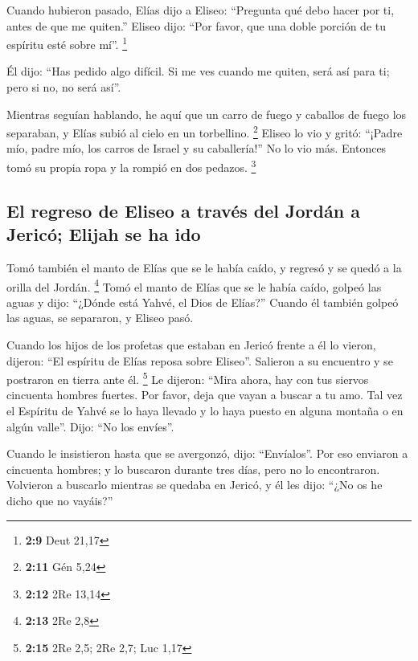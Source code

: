 \begin{paracol}{2}
 Cuando hubieron pasado, Elías dijo a Eliseo: ``Pregunta
qué debo hacer por ti, antes de que me quiten.'' Eliseo dijo: ``Por
favor, que una doble porción de tu espíritu esté sobre mí''. \footnote{\textbf{2:9}
  Deut 21,17}

 Él dijo: ``Has pedido algo difícil. Si me ves cuando me
quiten, será así para ti; pero si no, no será así''.

 Mientras seguían hablando, he aquí que un carro de fuego
y caballos de fuego los separaban, y Elías subió al cielo en un
torbellino. \footnote{\textbf{2:11} Gén 5,24}  Eliseo lo
vio y gritó: ``¡Padre mío, padre mío, los carros de Israel y su
caballería!'' No lo vio más. Entonces tomó su propia ropa y la rompió en
dos pedazos. \footnote{\textbf{2:12} 2Re 13,14}

\hypertarget{el-regreso-de-eliseo-a-travuxe9s-del-jorduxe1n-a-jericuxf3-elijah-se-ha-ido}{%
\subsection{El regreso de Eliseo a través del Jordán a Jericó; Elijah se
ha
ido}\label{el-regreso-de-eliseo-a-travuxe9s-del-jorduxe1n-a-jericuxf3-elijah-se-ha-ido}}

 Tomó también el manto de Elías que se le había caído, y
regresó y se quedó a la orilla del Jordán. \footnote{\textbf{2:13} 2Re
  2,8}  Tomó el manto de Elías que se le había caído,
golpeó las aguas y dijo: ``¿Dónde está Yahvé, el Dios de Elías?'' Cuando
él también golpeó las aguas, se separaron, y Eliseo pasó.

 Cuando los hijos de los profetas que estaban en Jericó
frente a él lo vieron, dijeron: ``El espíritu de Elías reposa sobre
Eliseo''. Salieron a su encuentro y se postraron en tierra ante él.
\footnote{\textbf{2:15} 2Re 2,5; 2Re 2,7; Luc 1,17}  Le
dijeron: ``Mira ahora, hay con tus siervos cincuenta hombres fuertes.
Por favor, deja que vayan a buscar a tu amo. Tal vez el Espíritu de
Yahvé se lo haya llevado y lo haya puesto en alguna montaña o en algún
valle''. Dijo: ``No los envíes''.

 Cuando le insistieron hasta que se avergonzó, dijo:
``Envíalos''. Por eso enviaron a cincuenta hombres; y lo buscaron
durante tres días, pero no lo encontraron.  Volvieron a
buscarlo mientras se quedaba en Jericó, y él les dijo: ``¿No os he dicho
que no vayáis?''


\end{paracol}
